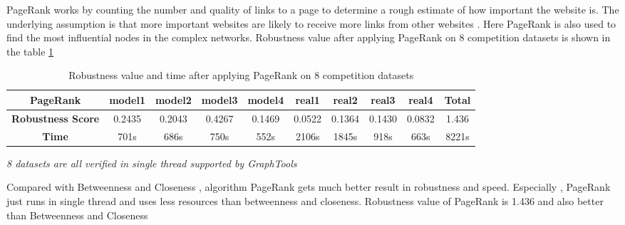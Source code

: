 \documentclass{article}
\begin{document}
	
	PageRank works by counting the number and quality of links to a page to determine a rough estimate of how important the website is. The underlying assumption is that more important websites are likely to receive more links from other websites \cite{wikiPageRank}\cite{page1999pagerank}. Here PageRank is also used to find the most influential nodes in the complex networks. Robustness value after applying PageRank on 8 competition datasets is shown in the table \ref{tab:table4}
	
	\begin{table}[!htbp]
	\begin{adjustwidth}{-1.3cm}{}		
		\begin{threeparttable}
			\centering
			\caption{Robustness value and time after applying PageRank on 8 competition datasets}
			\label{tab:table4}
			
			\begin{tabular}{|c|c|c|c|c|c|c|c|c|c|}
				\hline
				\textbf{PageRank}          & \textbf{model1} & \textbf{model2} & \textbf{model3} & \textbf{model4} & \textbf{real1} & \textbf{real2} & \textbf{real3} & \textbf{real4} & \textbf{Total} \\ \hline
				\textbf{Robustness Score} & 0.2435          & 0.2043          & 0.4267          & 0.1469          & 0.0522         & 0.1364         & 0.1430         & 0.0832         & 1.436          \\ \hline
				\textbf{Time}     & 701s             & 686s             & 750s             & 552s             & 2106s           & 1845s           & 918s            & 663s            & 8221s           \\ \hline							
			\end{tabular}
			\begin{tablenotes}
				\small
				\item\textit{8 datasets are all verified in single thread supported by GraphTools \cite{peixotographtool2014} }
			\end{tablenotes}			
		\end{threeparttable}
	\end{adjustwidth}
	\end{table}

		
	Compared with Betweenness and Closeness , algorithm PageRank gets much better result in robustness and speed. Especially , PageRank just runs in single thread and uses less resources than betweenness and closeness. Robustness value of PageRank is 1.436 and also better than Betweenness and Closeness 
	
\end{document}
